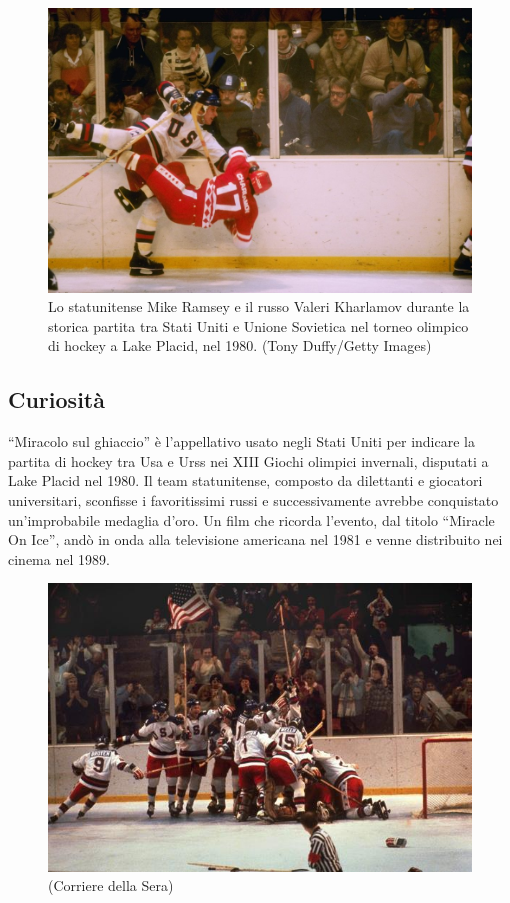 \documentclass[
]{book}
\begin{document}
\begin{figure}
\includegraphics[width=0.8\linewidth]{images/IlPost/1980} \caption{Lo statunitense Mike Ramsey e il russo Valeri Kharlamov durante la storica partita tra Stati Uniti e Unione Sovietica nel torneo olimpico di hockey a Lake Placid, nel 1980. (Tony Duffy/Getty Images)}\label{fig:unnamed-chunk-42}
\end{figure}

\subsection*{Curiosità}\label{curiosituxe0-3}

``Miracolo sul ghiaccio'' è l'appellativo usato negli Stati Uniti per indicare la partita di hockey tra Usa e Urss nei XIII Giochi olimpici invernali, disputati a Lake Placid nel 1980. Il team statunitense, composto da dilettanti e giocatori universitari, sconfisse i favoritissimi russi e successivamente avrebbe conquistato un'improbabile medaglia d'oro. Un film che ricorda l'evento, dal titolo ``Miracle On Ice'', andò in onda alla televisione americana nel 1981 e venne distribuito nei cinema nel 1989.

\begin{figure}
\includegraphics[width=0.8\linewidth]{images/corriere/1980} \caption{(Corriere della Sera)}\label{fig:unnamed-chunk-43}
\end{figure}
\end{document}
